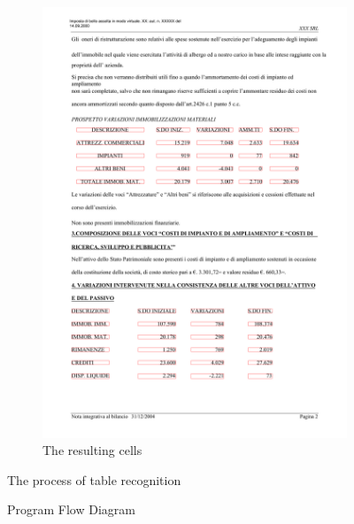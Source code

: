 \begin{figure}[H]
\begin{subfigure}{0.45\textwidth}
\includegraphics[width=\linewidth]{img/implementation/implem4.png}
\caption{The resulting cells} \label{fig:1c}
\end{subfigure}
\caption{The process of table recognition} \label{fig:1}
\end{figure}

\begin{figure}
    \noindent
	\caption{Program Flow Diagram}
	\label{fig:mff}
\end{figure}
